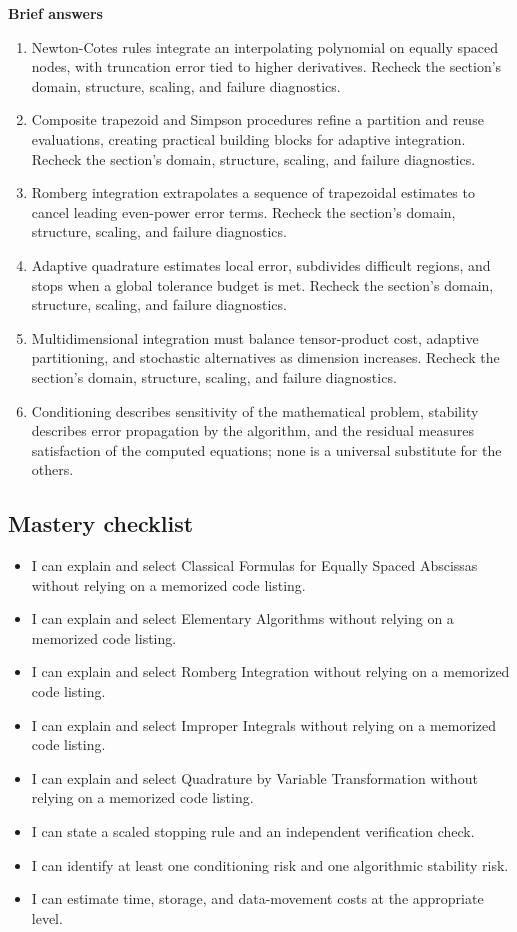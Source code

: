 \documentclass[10pt,letterpaper]{article}
\begin{document}
\textbf{Brief answers}
\begin{enumerate}
\item Newton-Cotes rules integrate an interpolating polynomial on equally spaced nodes, with truncation error tied to higher derivatives. Recheck the section's domain, structure, scaling, and failure diagnostics.
\item Composite trapezoid and Simpson procedures refine a partition and reuse evaluations, creating practical building blocks for adaptive integration. Recheck the section's domain, structure, scaling, and failure diagnostics.
\item Romberg integration extrapolates a sequence of trapezoidal estimates to cancel leading even-power error terms. Recheck the section's domain, structure, scaling, and failure diagnostics.
\item Adaptive quadrature estimates local error, subdivides difficult regions, and stops when a global tolerance budget is met. Recheck the section's domain, structure, scaling, and failure diagnostics.
\item Multidimensional integration must balance tensor-product cost, adaptive partitioning, and stochastic alternatives as dimension increases. Recheck the section's domain, structure, scaling, and failure diagnostics.
\item Conditioning describes sensitivity of the mathematical problem, stability describes error propagation by the algorithm, and the residual measures satisfaction of the computed equations; none is a universal substitute for the others.
\end{enumerate}

\subsection*{Mastery checklist}
\begin{itemize}
\item[$\square$] I can explain and select Classical Formulas for Equally Spaced Abscissas without relying on a memorized code listing.
\item[$\square$] I can explain and select Elementary Algorithms without relying on a memorized code listing.
\item[$\square$] I can explain and select Romberg Integration without relying on a memorized code listing.
\item[$\square$] I can explain and select Improper Integrals without relying on a memorized code listing.
\item[$\square$] I can explain and select Quadrature by Variable Transformation without relying on a memorized code listing.
\item[$\square$] I can state a scaled stopping rule and an independent verification check.
\item[$\square$] I can identify at least one conditioning risk and one algorithmic stability risk.
\item[$\square$] I can estimate time, storage, and data-movement costs at the appropriate level.
\end{itemize}
\end{document}
